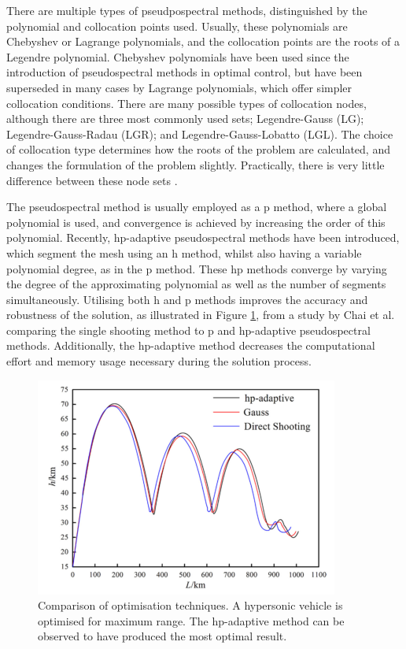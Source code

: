  There are multiple types of pseudpospectral methods, distinguished by the polynomial and collocation points used. Usually, these polynomials are Chebyshev or Lagrange polynomials\cite{Fahroo2000,Rao2009}, and the collocation points are the roots of a Legendre polynomial\cite{Garg2009}. Chebyshev polynomials have been used since the introduction of pseudospectral methods in optimal control, but have been superseded in many cases by Lagrange polynomials, which offer simpler collocation conditions\cite{Rao2009}. 
 There are many possible types of collocation nodes, although there are three most commonly used sets; Legendre-Gauss (LG); Legendre-Gauss-Radau (LGR); and Legendre-Gauss-Lobatto (LGL)\cite{Garg2009,Rao2009}. The choice of collocation type determines how the roots of the problem are calculated, and changes the formulation of the problem slightly\cite{Garg2009}. Practically, there is very little difference between these node sets \cite{Garg2009}.
 
 
 The pseudospectral method is usually employed as a p method, where a global polynomial is used, and convergence is achieved by increasing the order of this polynomial\cite{Rao2009}. Recently, hp-adaptive pseudospectral methods have been introduced, which segment the mesh using an h method, whilst also having a variable polynomial degree, as in the p method\cite{Darby2011a}. These hp methods converge by varying the degree of the approximating polynomial as well as the number of segments simultaneously. Utilising both h and p methods improves the accuracy and robustness of the solution, as illustrated in Figure \ref{fig:OptimisationMethodComparisonChai}, from a study by Chai et al.\cite{Chai2015} comparing the single shooting method to p and hp-adaptive pseudospectral methods. Additionally, the hp-adaptive method decreases the computational effort and memory usage necessary during the solution process\cite{Darby2011a,Chai2015}. 


\begin{figure}
	\centering
	\includegraphics[width=0.7\linewidth]{figures/2_literature-review/OptimisationMethodComparisonChai}
	\caption{Comparison of optimisation techniques\cite{Chai2015}. A hypersonic vehicle is optimised for maximum range. The hp-adaptive method can be observed to have produced the most optimal result.}
	\label{fig:OptimisationMethodComparisonChai}
\end{figure}

